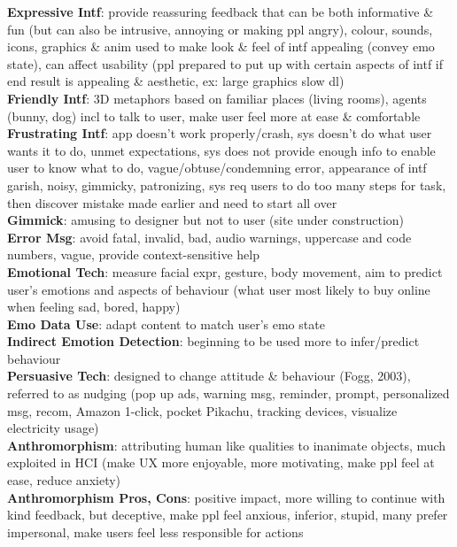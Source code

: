 \documentclass[a4paper]{article}
\begin{document}
\begin{multicols}{3}
        \textbf{Expressive Intf}: provide reassuring feedback that can be both informative \& fun (but can also be intrusive, annoying or making ppl angry), colour, sounds, icons, graphics \& anim used to make look \& feel of intf appealing (convey emo state), can affect usability (ppl prepared to put up with certain aspects of intf if end result is appealing \& aesthetic, ex: large graphics slow dl)\\
        \textbf{Friendly Intf}: 3D metaphors based on familiar places (living rooms), agents (bunny, dog) incl to talk to user, make user feel more at ease \& comfortable\\
        \textbf{Frustrating Intf}: app doesn't work properly/crash, sys doesn't do what user wants it to do, unmet expectations, sys does not provide enough info to enable user to know what to do, vague/obtuse/condemning error, appearance of intf garish, noisy, gimmicky, patronizing, sys req users to do too many steps for task, then discover mistake made earlier and need to start all over\\
        \textbf{Gimmick}: amusing to designer but not to user (site under construction)\\
        \textbf{Error Msg}: avoid fatal, invalid, bad, audio warnings, uppercase and code numbers, vague, provide context-sensitive help\\
        \textbf{Emotional Tech}: measure facial expr, gesture, body movement, aim to predict user's emotions and aspects of behaviour (what user most likely to buy online when feeling sad, bored, happy)\\
        \textbf{Emo Data Use}: adapt content to match user's emo state\\
        \textbf{Indirect Emotion Detection}: beginning to be used more to infer/predict behaviour\\
        \textbf{Persuasive Tech}: designed to change attitude \& behaviour (Fogg, 2003), referred to as nudging (pop up ads, warning msg, reminder, prompt, personalized msg, recom, Amazon 1-click, pocket Pikachu, tracking devices, visualize electricity usage)\\
        \textbf{Anthromorphism}: attributing human like qualities to inanimate objects, much exploited in HCI (make UX more enjoyable, more motivating, make ppl feel at ease, reduce anxiety)\\
        \textbf{Anthromorphism Pros, Cons}: positive impact, more willing to continue with kind feedback, but deceptive, make ppl feel anxious, inferior, stupid, many prefer impersonal, make users feel less responsible for actions\\

\end{multicols}
\end{document}
